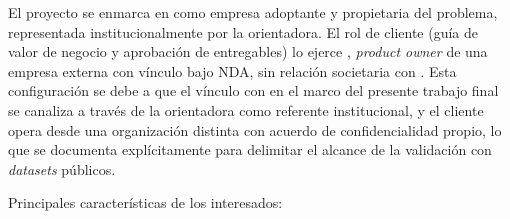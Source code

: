 \documentclass[
  11pt, %
]{charter}
\begin{document}
El proyecto se enmarca en \empclientename\hspace{1px} como empresa adoptante y propietaria del problema, representada institucionalmente por la orientadora. El rol de cliente (guía de valor de negocio y aprobación de entregables) lo ejerce \clientename, \textit{product owner} de una empresa externa con vínculo bajo NDA, sin relación societaria con \empclientename. Esta configuración se debe a que el vínculo con \empclientename\hspace{1px} en el marco del presente trabajo final se canaliza a través de la orientadora como referente institucional, y el cliente opera desde una organización distinta con acuerdo de confidencialidad propio, lo que se documenta explícitamente para delimitar el alcance de la validación con \textit{datasets} públicos.

Principales características de los interesados:
\end{document}
